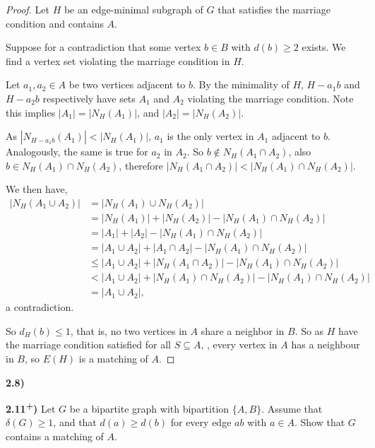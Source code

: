 \documentclass[11pt]{article}
\theoremstyle{plain}
\begin{document}
\begin{proof}
Let $H$ be an edge-minimal subgraph of $G$ that satisfies the marriage condition and contains $A$.

Suppose for a contradiction that some vertex $b \in B$ with $d(b) \geq 2$ exists. We find a vertex set violating the marriage condition in $H$.

Let $a_1,a_2 \in A$ be two vertices adjacent to $b$. By the minimality of $H$, $H-a_1b$ and $H-a_2b$ respectively have sets $A_1$ and $A_2$ violating the marriage condition. Note this implies $|A_1| = |N_H(A_1)|$, and $|A_2| = |N_H(A_2)|$.

As $|N_{H-a_1b}(A_1)| < |N_{H}(A_1)|$, $a_1$ is the only vertex in $A_1$ adjacent to $b$. Analogously, the same is true for $a_2$ in $A_2$. So $b \not \in N_H(A_1 \cap A_2)$, also $b \in N_H(A_1) \cap N_H(A_2) $, therefore $|N_H(A_1 \cap A_2)| < | N_H(A_1) \cap N_H(A_2)|$.

We then have,
\begin{align*}
|N_H(A_1 \cup A_2)| &= |N_H(A_1) \cup N_H(A_2)| \\
& = |N_H(A_1)| + |N_H(A_2)| - |N_H(A_1) \cap N_H(A_2)| \\
& = |A_1| + |A_2| - |N_H(A_1) \cap N_H(A_2)| \\
& = |A_1 \cup A_2| + |A_1 \cap A_2| - |N_H(A_1) \cap N_H(A_2)| \\
& \leq |A_1 \cup A_2| + |N_H(A_1 \cap A_2)| - |N_H(A_1) \cap N_H(A_2)| \\
& < |A_1 \cup A_2| + | N_H(A_1) \cap N_H(A_2)| - |N_H(A_1) \cap N_H(A_2)| \\
& = |A_1 \cup A_2|,
\end{align*}
a contradiction.

So $d_H(b) \leq 1$, that is, no two vertices in $A$ share a neighbor in $B$. So as $H$ have the marriage condition satisfied for all $S \subseteq A$, , every vertex in $A$ has a neighbour in $B$, so $E(H)$ is a matching of $A$.

\end{proof}



\textbf{2.8)}

\textbf{2.11\textsuperscript{+})} Let $G$ be a bipartite graph with bipartition $\{A,B\}$. Assume that $\delta(G) \geq 1$, and that $d(a) \geq d(b)$ for every edge $ab$ with $a \in A$. Show that $G$ contains a matching of $A$.
\end{document}
